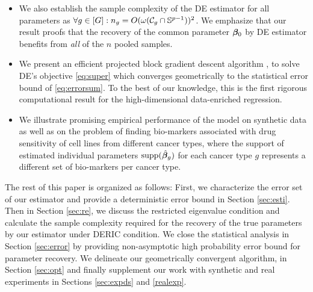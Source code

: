 \begin{itemize}[leftmargin = .4cm]
	\item We also establish the sample complexity of the DE estimator for all parameters as $\forall g \in [G]: n_g = O(\omega(\cC_g \cap \sphere))^2$. We emphasize that our result proofs that the recovery of the common parameter $\boldsymbol{\beta}_0$ by DE estimator benefits from \emph{all} of the $n$ pooled samples.
	\item We present an efficient projected block gradient descent algorithm \emph{\dc}, to solve DE's objective \eqref{eq:super} which converges geometrically to the statistical error bound of \eqref{eq:errorsum}. To the best of our knowledge, this is the first rigorous computational result for the high-dimensional data-enriched regression.
	\item We illustrate promising empirical performance of the model on synthetic data as well as on the problem of finding bio-markers associated with drug sensitivity of cell lines from different cancer types, where the support of estimated individual parameters $\text{supp}(\hat{\boldsymbol{\beta}}_g)$ for each cancer type $g$ represents a different set of bio-markers per cancer type.
\end{itemize}

The rest of this paper is organized as follows:
First, we characterize the error set of our estimator and provide a deterministic error bound in Section \ref{sec:esti}.
Then in Section \ref{sec:re}, we discuss the restricted eigenvalue condition and calculate the sample complexity required for the recovery of the true parameters by our estimator under DERIC condition.
We close the statistical analysis in Section \ref{sec:error} by providing non-asymptotic high probability error bound for parameter recovery.
We delineate our geometrically convergent algorithm, \dc{} in Section \ref{sec:opt} and finally supplement our work with synthetic and real experiments in Sections \ref{sec:expds} and \ref{realexp}.


